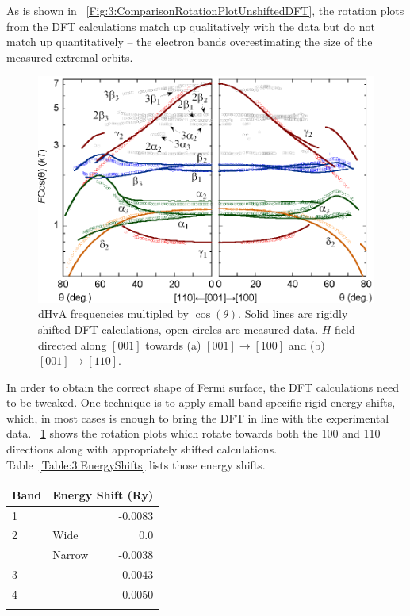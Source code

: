 As is shown in \fig~\ref{Fig:3:ComparisonRotationPlotUnshiftedDFT}, the rotation plots from the DFT calculations match up qualitatively with the data but do not match up quantitatively -- the electron bands overestimating the size of the measured extremal orbits. 

\begin{figure}[h!]
    \begin{center}
        \includegraphics[scale=0.7]{Chapter3-dHvABaFe2P2/Figures/AngleDepMeasurements/AngleSweepRigidShift/AngleSweepRigidShift}
        \caption{dHvA frequencies multipled by $\cos(\theta)$. Solid lines are rigidly shifted DFT calculations, open circles are measured data. $H$ field directed along $[001]$ towards (a) $[001]\rightarrow[100]$ and (b) $[001]\rightarrow[110]$.}
        \label{Fig:3:AngleSweepRigidShift}
    \end{center}
\end{figure}

In order to obtain the correct shape of Fermi surface, the DFT calculations need to be tweaked. One technique is to apply small band-specific rigid energy shifts, which, in most cases is enough to bring the DFT in line with the experimental data. \fig~\ref{Fig:3:AngleSweepRigidShift} shows the rotation plots which rotate towards both the 100 and 110 directions along with appropriately shifted calculations. Table~\ref{Table:3:EnergyShifts} lists those energy shifts.

\medskip

\begin{center}
    \begin{tabular}[h!]{llr}
\toprule
Band    & \multicolumn{2}{l}{Energy Shift (\unit{Ry})} \\
\midrule
1       &       & -0.0083      \\
2       & Wide  & 0.0          \\
        & Narrow & -0.0038     \\
3       &       & 0.0043       \\
4       &       & 0.0050        \\
\bottomrule
    \label{Table:3:EnergyShifts}
    \end{tabular}
\end{center}

